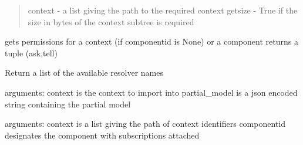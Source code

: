\documentclass[letterpaper,10pt,english]{sphinxmanual}
\begin{document}
\begin{fulllineitems}
\begin{fulllineitems}
\begin{quote}
context - a list giving the path to the required context
getsize - True if the size in bytes of the context subtree is required
\end{quote}

\end{fulllineitems}


\begin{fulllineitems}
\label{API:personis.client.Access.getpermission}
gets permissions for a context (if componentid is None) or
a component
returns a tuple (ask,tell)

\end{fulllineitems}


\begin{fulllineitems}
\label{API:personis.client.Access.getresolvers}
Return a list of the available resolver names

\end{fulllineitems}


\begin{fulllineitems}
\label{API:personis.client.Access.import_model}
arguments:
context is the context to import into
partial\_model is a json encoded string containing the partial model

\end{fulllineitems}


\begin{fulllineitems}
\label{API:personis.client.Access.list_subs}
arguments:
context is a list giving the path of context identifiers
componentid designates the component with subscriptions attached

\end{fulllineitems}



\end{fulllineitems}
\end{document}
